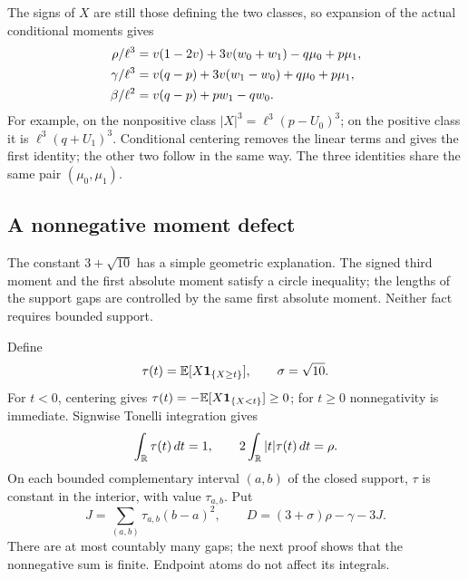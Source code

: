 The signs of $X$ are still those defining the two classes, so expansion
of the actual conditional moments gives
\begin{align}
 \rho/\ell^3&=v(1-2v)+3v(w_0+w_1)-q\mu_0+p\mu_1,\notag\\
 \gamma/\ell^3&=v(q-p)+3v(w_1-w_0)+q\mu_0+p\mu_1,\notag\\
 \beta/\ell^2&=v(q-p)+pw_1-qw_0.
\label{ms:conditional-moments}
\end{align}
For example, on the nonpositive class $|X|^3=\ell^3(p-U_0)^3$;
on the positive class it is $\ell^3(q+U_1)^3$. Conditional centering removes
the linear terms and gives the first identity; the other two follow in
the same way. The three identities share the same pair $(\mu_0,\mu_1)$.

\subsection{A nonnegative moment defect}

The constant $3+\sqrt{10}$ has a simple geometric explanation. The
signed third moment and the first absolute moment satisfy a circle
inequality; the lengths of the support gaps are controlled by the same
first absolute moment. Neither fact requires bounded support.

Define
\[
 \tau(t)=\mathbb E[X\mathbf1_{\{X\ge t\}}],\qquad \sigma=\sqrt{10}.
\]
For $t<0$, centering gives $\tau(t)=-\mathbb E[X\mathbf1_{\{X<t\}}]\ge0$;
for $t\ge0$ nonnegativity is immediate. Signwise Tonelli integration gives
\begin{equation}
 \int_\mathbb R\tau(t)\,dt=1,
 \qquad 2\int_\mathbb R|t|\tau(t)\,dt=\rho.
\label{ms:tau-moments}
\end{equation}
On each bounded complementary interval $(a,b)$ of the closed support,
$\tau$ is constant in the interior, with value $\tau_{a,b}$. Put
\begin{equation}
 J=\sum_{(a,b)}\tau_{a,b}(b-a)^2,
 \qquad D=(3+\sigma)\rho-\gamma-3J.
\label{ms:physical-defect-definition}
\end{equation}
There are at most countably many gaps; the next proof shows that the
nonnegative sum is finite. Endpoint atoms do not affect its integrals.

